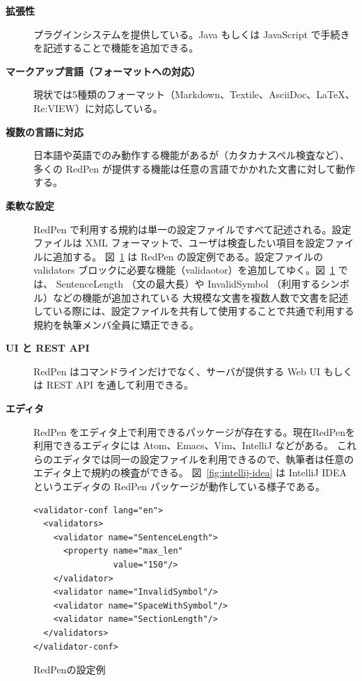 \documentclass[a4j,twocolumn]{jarticle}
\begin{document}
\begin{description}

\item[{\bf 拡張性}]
   プラグインシステムを提供している。Java もしくは JavaScript で手続きを記述することで機能を追加できる。

 \item[{\bf マークアップ言語（フォーマットへの対応）}]
  現状では5種類のフォーマット（Markdown、Textile、AsciiDoc、LaTeX、Re:VIEW）に対応している。

\item[{\bf 複数の言語に対応}]
  日本語や英語でのみ動作する機能があるが（カタカナスペル検査など）、多くの RedPen が提供する機能は任意の言語でかかれた文書に対して動作する。

\item[{\bf 柔軟な設定}]
  RedPen で利用する規約は単一の設定ファイルですべて記述される。設定ファイルは XML フォーマットで、ユーザは検査したい項目を設定ファイルに追加する。
  図~\ref{fig:conf} は RedPen の設定例である。設定ファイルの validators ブロックに必要な機能（validaotor）を追加してゆく。図~\ref{fig:conf} では、
  SentenceLength （文の最大長）や InvalidSymbol （利用するシンボル）などの機能が追加されている
  大規模な文書を複数人数で文書を記述している際には、設定ファイルを共有して使用することで共通で利用する規約を執筆メンバ全員に矯正できる。

\item[{\bf UI と REST API}]
  RedPen はコマンドラインだけでなく、サーバが提供する Web UI もしくは REST API を通して利用できる。

\item[{\bf エディタ}]
  RedPen をエディタ上で利用できるパッケージが存在する。現在RedPenを利用できるエディタには Atom、Emacs、Vim、IntelliJ などがある。
  これらのエディタでは同一の設定ファイルを利用できるので、執筆者は任意のエディタ上で規約の検査ができる。
  図~\ref{fig:intellij-idea} は IntelliJ IDEA というエディタの RedPen パッケージが動作している様子である。

\end{description}

\begin{figure}
  \scriptsize
  \small
  \begin{verbatim}
<validator-conf lang="en">
  <validators>
    <validator name="SentenceLength">
      <property name="max_len"
                value="150"/>
    </validator>
    <validator name="InvalidSymbol"/>
    <validator name="SpaceWithSymbol"/>
    <validator name="SectionLength"/>
  </validators>
</validator-conf>
  \end{verbatim}
  \normalsize
  \caption{RedPenの設定例}
  \label{fig:conf}
\end{figure}
\end{document}
